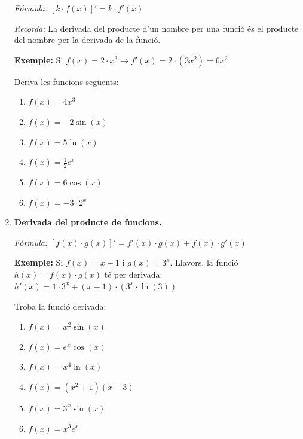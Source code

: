 \documentclass[12pt,a4paper]{article}
\begin{document}
\begin{enumerate}[leftmargin=*, label=\textbf{\arabic*.}]
    \textit{Fórmula:} $[k \cdot f(x)]' = k \cdot f'(x)$
    
    \textit{Recorda:} La derivada del producte d'un nombre per una funció és el producte del nombre per la derivada de la funció.
    
    \textbf{Exemple:} Si $f(x) = 2 \cdot x^3 \rightarrow f'(x) = 2 \cdot (3x^2) = 6x^2$
    \vspace{0.2cm}
    
    Deriva les funcions següents:
    \begin{multicols}{2}
    \begin{enumerate}[label=\alph*)]
        \item $f(x) = 4x^3$
        \item $f(x) = -2\sin(x)$
        \item $f(x) = 5\ln(x)$
        \item $f(x) = \frac{1}{2} e^x$
        \item $f(x) = 6\cos(x)$
        \item $f(x) = -3 \cdot 2^x$
    \end{enumerate}
    \end{multicols}
    \vspace{0.4cm}
    \newpage
    \item \textbf{Derivada del producte de funcions.}
    
    \textit{Fórmula:} $[f(x) \cdot g(x)]' = f'(x) \cdot g(x) + f(x) \cdot g'(x)$
    
    \textbf{Exemple:} Si $f(x) = x - 1$ i $g(x) = 3^x$. Llavors, la funció $h(x) = f(x) \cdot g(x)$ té per derivada: $h'(x) = 1 \cdot 3^x + (x - 1) \cdot (3^x \cdot \ln(3))$
    \vspace{0.2cm}
    
    Troba la funció derivada:
    \begin{multicols}{2}
    \begin{enumerate}[label=\alph*)]
        \item $f(x) = x^2 \sin(x)$
        \item $f(x) = e^x \cos(x)$
        \item $f(x) = x^4 \ln(x)$
        \item $f(x) = (x^2 + 1)(x - 3)$
        \item $f(x) = 3^x \sin(x)$
        \item $f(x) = x^3 e^x$
    \end{enumerate}
    \end{multicols}
    \vspace{0.4cm}


\end{enumerate}
\end{document}
